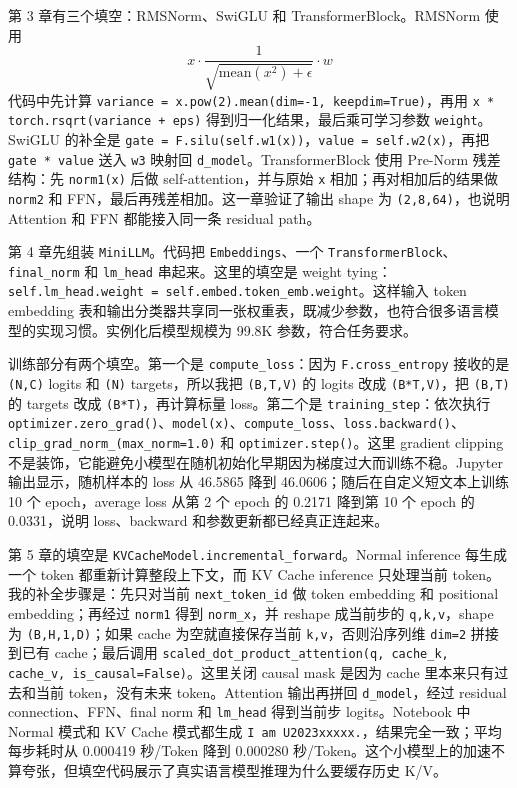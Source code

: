 \documentclass[12pt,a4paper,UTF8]{ctexart}
\newcommand{\xiaosi}{\fontsize{12pt}{18pt}\selectfont}
\newenvironment{reportbody}{\songti\xiaosi\onehalfspacing\sloppy}{}
\begin{document}
\begin{reportbody}
第 3 章有三个填空：RMSNorm、SwiGLU 和 TransformerBlock。RMSNorm 使用
\[
x \cdot \frac{1}{\sqrt{\mathrm{mean}(x^2)+\epsilon}} \cdot w
\]
代码中先计算 \texttt{variance = x.pow(2).mean(dim=-1, keepdim=True)}，再用 \texttt{x * torch.rsqrt(variance + eps)} 得到归一化结果，最后乘可学习参数 \texttt{weight}。SwiGLU 的补全是 \texttt{gate = F.silu(self.w1(x))}，\texttt{value = self.w2(x)}，再把 \texttt{gate * value} 送入 \texttt{w3} 映射回 \texttt{d\_model}。TransformerBlock 使用 Pre-Norm 残差结构：先 \texttt{norm1(x)} 后做 self-attention，并与原始 \texttt{x} 相加；再对相加后的结果做 \texttt{norm2} 和 FFN，最后再残差相加。这一章验证了输出 shape 为 \texttt{(2,8,64)}，也说明 Attention 和 FFN 都能接入同一条 residual path。

第 4 章先组装 \texttt{MiniLLM}。代码把 \texttt{Embeddings}、一个 \texttt{TransformerBlock}、\texttt{final\_norm} 和 \texttt{lm\_head} 串起来。这里的填空是 weight tying：\texttt{self.lm\_head.weight = self.embed.token\_emb.weight}。这样输入 token embedding 表和输出分类器共享同一张权重表，既减少参数，也符合很多语言模型的实现习惯。实例化后模型规模为 99.8K 参数，符合任务要求。

训练部分有两个填空。第一个是 \texttt{compute\_loss}：因为 \texttt{F.cross\_entropy} 接收的是 \texttt{(N,C)} logits 和 \texttt{(N)} targets，所以我把 \texttt{(B,T,V)} 的 logits 改成 \texttt{(B*T,V)}，把 \texttt{(B,T)} 的 targets 改成 \texttt{(B*T)}，再计算标量 loss。第二个是 \texttt{training\_step}：依次执行 \texttt{optimizer.zero\_grad()}、\texttt{model(x)}、\texttt{compute\_loss}、\texttt{loss.backward()}、\texttt{clip\_grad\_norm\_(max\_norm=1.0)} 和 \texttt{optimizer.step()}。这里 gradient clipping 不是装饰，它能避免小模型在随机初始化早期因为梯度过大而训练不稳。Jupyter 输出显示，随机样本的 loss 从 46.5865 降到 46.0606；随后在自定义短文本上训练 10 个 epoch，average loss 从第 2 个 epoch 的 0.2171 降到第 10 个 epoch 的 0.0331，说明 loss、backward 和参数更新都已经真正连起来。

第 5 章的填空是 \texttt{KVCacheModel.incremental\_forward}。Normal inference 每生成一个 token 都重新计算整段上下文，而 KV Cache inference 只处理当前 token。我的补全步骤是：先只对当前 \texttt{next\_token\_id} 做 token embedding 和 positional embedding；再经过 \texttt{norm1} 得到 \texttt{norm\_x}，并 reshape 成当前步的 \texttt{q,k,v}，shape 为 \texttt{(B,H,1,D)}；如果 cache 为空就直接保存当前 \texttt{k,v}，否则沿序列维 \texttt{dim=2} 拼接到已有 cache；最后调用 \texttt{scaled\_dot\_product\_attention(q, cache\_k, cache\_v, is\_causal=False)}。这里关闭 causal mask 是因为 cache 里本来只有过去和当前 token，没有未来 token。Attention 输出再拼回 \texttt{d\_model}，经过 residual connection、FFN、final norm 和 \texttt{lm\_head} 得到当前步 logits。Notebook 中 Normal 模式和 KV Cache 模式都生成 \texttt{I am U2023xxxxx.}，结果完全一致；平均每步耗时从 0.000419 秒/Token 降到 0.000280 秒/Token。这个小模型上的加速不算夸张，但填空代码展示了真实语言模型推理为什么要缓存历史 K/V。


\end{reportbody}
\end{document}
